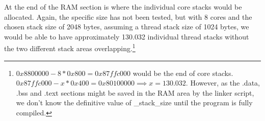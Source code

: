 At the end of the RAM section is where the individual core stacks would be
allocated. Again, the specific size has not been tested, but with 8 cores and
the chosen stack size of 2048 bytes, assuming a thread stack size of 1024
bytes, we would be able to have approximately 130.032 individual thread stacks
without the two different stack areas overlapping.\footnote{$0x8800000 -
8*0x800 = 0x87ffc000$ would be the end of core stacks. $0x87ffc000 - x*0x400 =
0x80100000 \implies x = 130.032$. However, as the .data, .bss and .text
sections might be saved in the RAM area by the linker script, we don't know the
definitive value of \_stack\_size until the program is fully compiled.}

